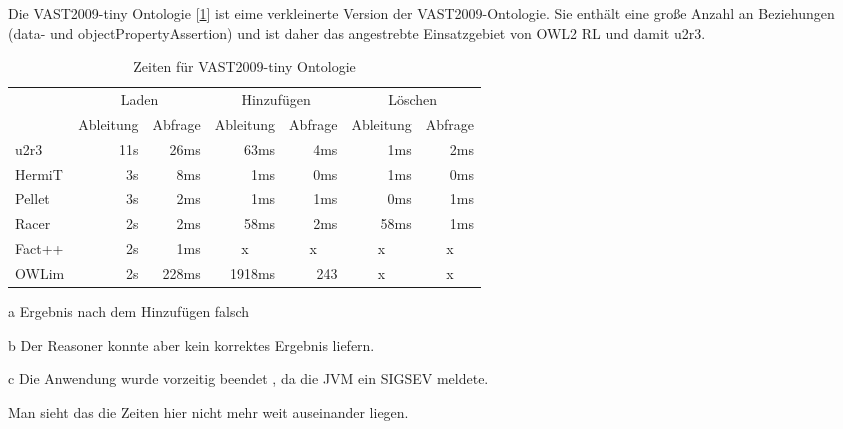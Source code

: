 Die VAST2009-tiny Ontologie [\ref{table-time-vast-tiny}] ist eime verkleinerte Version der VAST2009-Ontologie. Sie enthält eine große Anzahl an Beziehungen (data- und objectPropertyAssertion) und ist daher das angestrebte Einsatzgebiet von OWL2 RL und damit u2r3.

\begin{table}[htbp]
\caption{Zeiten für VAST2009-tiny Ontologie}
\label{table-time-vast-tiny}
\begin{center}
\begin{threeparttable}
\begin{tabular}{l|r|r|r|r|r|r|}
\cline{2-7}
 & \multicolumn{2}{|c|}{Laden} & \multicolumn{2}{|c|}{Hinzufügen} & \multicolumn{2}{|c|}{Löschen} \\
\cline{2-7}
 & \multicolumn{1}{|c|}{Ableitung} & \multicolumn{1}{|c|}{Abfrage} & \multicolumn{1}{|c|}{Ableitung} & \multicolumn{1}{|c|}{Abfrage} & \multicolumn{1}{|c|}{Ableitung} & \multicolumn{1}{|c|}{Abfrage} \\
\hline
\multicolumn{1}{|l|}{u2r3} & 11s & 26ms & 63ms & 4ms & 1ms & 2ms \\ \hline
\multicolumn{1}{|l|}{HermiT\tnote{a}} & 3s & 8ms & 1ms & 0ms & 1ms & 0ms \\ \hline
\multicolumn{1}{|l|}{Pellet\tnote{b}} & 3s & 2ms & 1ms & 1ms & 0ms & 1ms \\ \hline
\multicolumn{1}{|l|}{Racer\tnote{b}} & 2s & 2ms & 58ms & 2ms & 58ms & 1ms \\ \hline
\multicolumn{1}{|l|}{Fact++\tnote{c}} & 2s & 1ms & \multicolumn{1}{c|}{x} & \multicolumn{1}{c|}{x} & \multicolumn{1}{c|}{x} & \multicolumn{1}{c|}{x} \\ \hline
\multicolumn{1}{|l|}{OWLim} & 2s & 228ms & 1918ms & 243 & \multicolumn{1}{c|}{x} & \multicolumn{1}{c|}{x} \\ \hline
\end{tabular}
\begin{tablenotes}
	\item[a] Ergebnis nach dem Hinzufügen falsch
	\item[b] Der Reasoner konnte aber kein korrektes Ergebnis liefern.
	\item[c] Die Anwendung wurde vorzeitig beendet , da die JVM ein SIGSEV meldete.
\end{tablenotes}
\end{threeparttable}
\end{center}
\end{table}

Man sieht das die Zeiten hier nicht mehr weit auseinander liegen.

